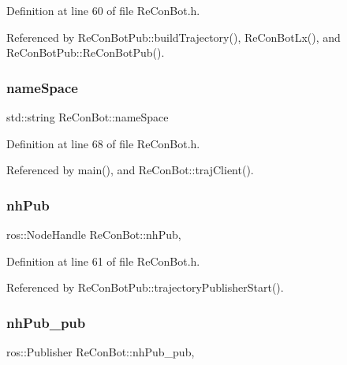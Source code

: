Definition at line 60 of file Re\+Con\+Bot.\+h.



Referenced by Re\+Con\+Bot\+Pub\+::build\+Trajectory(), Re\+Con\+Bot\+Lx(), and Re\+Con\+Bot\+Pub\+::\+Re\+Con\+Bot\+Pub().

\mbox{\label{class_re_con_bot_a40ca07cd606988b78664c4a52fd8dc59}} 
\subsubsection{\texorpdfstring{name\+Space}{nameSpace}}
{\footnotesize\ttfamily std\+::string Re\+Con\+Bot\+::name\+Space\hspace{0.3cm}{\ttfamily [inherited]}}



Definition at line 68 of file Re\+Con\+Bot.\+h.



Referenced by main(), and Re\+Con\+Bot\+::traj\+Client().

\mbox{\label{class_re_con_bot_a37edfe9c2dbbf37894c9bf850806fdd3}} 
\subsubsection{\texorpdfstring{nh\+Pub}{nhPub}}
{\footnotesize\ttfamily ros\+::\+Node\+Handle Re\+Con\+Bot\+::nh\+Pub\hspace{0.3cm}{\ttfamily [protected]}, {\ttfamily [inherited]}}



Definition at line 61 of file Re\+Con\+Bot.\+h.



Referenced by Re\+Con\+Bot\+Pub\+::trajectory\+Publisher\+Start().

\mbox{\label{class_re_con_bot_a549b7542d286b690f38b7ece8b83850b}} 
\subsubsection{\texorpdfstring{nh\+Pub\+\_\+pub}{nhPub\_pub}}
{\footnotesize\ttfamily ros\+::\+Publisher Re\+Con\+Bot\+::nh\+Pub\+\_\+pub\hspace{0.3cm}{\ttfamily [protected]}, {\ttfamily [inherited]}}



